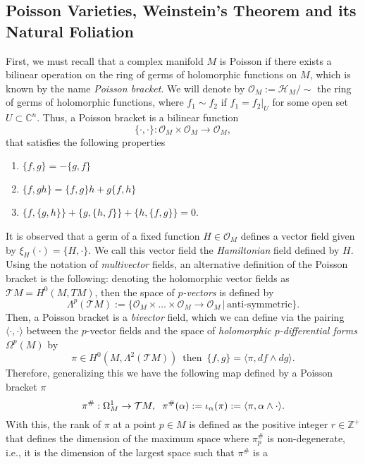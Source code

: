 \documentclass{article}
\newcommand{\zah}{\ensuremath{ \mathbb Z }}
\newcommand{\con}{\ensuremath{\mathbb{C}^n}}
\begin{document}
\subsection{Poisson Varieties, Weinstein's Theorem and its Natural Foliation}
\noindent First, we must recall that a complex manifold $M$ is Poisson if there exists a bilinear operation on the ring of germs of
holomorphic functions on $M$, which is known by the name \emph{Poisson bracket}.
We will denote by $\mathcal{O}_M:=\mathcal{H}_M/\sim$ the ring of germs of holomorphic functions, where $f_1\sim f_2$ if
$f_1=f_2|_U$ for some open set $U\subset\con$. Thus, a Poisson bracket is a bilinear function
\[
\{\cdot,\cdot\}:\mathcal{O}_M\times\mathcal{O}_M\rightarrow\mathcal{O}_M,
\]
that satisfies the following properties
\begin{enumerate}
\item $\{f,g\} = -\{g,f\}$
\item $\{f,gh\}=\{f,g\}h + g\{f,h\}$
\item $\{f,\{g,h\}\}+\{g,\{h,f\}\} + \{h,\{ f,g\}\}=0$.
\end{enumerate}
\noindent It is observed that a germ of a fixed function $H\in\mathcal{O}_M$ defines a vector field given by $\xi_H(\cdot)=\{H,\cdot\}$.
We call this vector field the \emph{Hamiltonian} field defined by $H$. Using the notation of \emph{multivector} fields,
an alternative definition of the Poisson bracket is the following: denoting the holomorphic vector fields as $\mathcal{T}M=H^0(M,TM)$,
then the space of \emph{$p$-vectors} is defined by
\[
        \Lambda^{p}(\mathcal{T}M):=\{\mathcal{O}_M\times\dots\times\mathcal{O}_M\rightarrow\mathcal{O}_M\,\vert\,\text{anti-symmetric}\}.
\]
Then, a Poisson bracket is a \emph{bivector} field, which we can define via the pairing $\langle\cdot,\cdot\rangle$
between the $p$-vector fields and the space of \emph{holomorphic $p$-differential forms} $\Omega^{p}(M)$ by
\[
        \pi\in H^0(M,\Lambda^2(\mathcal{T}M))\,\text{ then }\,\{f,g\}=\langle \pi,df\wedge dg\rangle.
\]
Therefore, generalizing this we have the following map defined by a Poisson bracket $\pi$
\[
        \pi^{\#}:\Omega^1_M\rightarrow\mathcal{T}M,\hspace{0.2cm}\pi^{\#}(\alpha):=\iota_{\alpha}(\pi):=\langle\pi,\alpha\wedge\cdot\rangle.
\]
\noindent With this, the rank of $\pi$ at a point $p\in M$ is defined as the positive integer $r\in \zah^{+}$ that defines the dimension of the
maximum space where $\pi^{\#}_p$ is non-degenerate, i.e., it is the dimension of the largest space such that $\pi^{\#}$ is a
\end{document}
